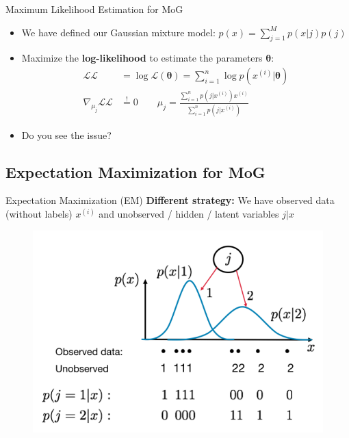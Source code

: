 \begin{frame}{Maximum Likelihood Estimation for MoG}{}
	\begin{itemize}
		\item We have defined our Gaussian mixture model: $p(x) = \sum_{j=1}^M p(x \vert j) p(j)$
		\item Maximize the \textbf{log-likelihood} to estimate the parameters $\bm{\theta}$:
		\begin{align}
			\mathcal{L}\mathcal{L}
				&= \log \mathcal{L}(\bm{\theta}) = \sum_{i=1}^n \log p(x^{(i)} \vert \bm{\theta}) \\[3mm]
			\nabla_{\mu_j} \mathcal{L}\mathcal{L} &\overset{!}{=} 0
			\qquad
			\mu_j = \frac{\sum_{i=1}^n p(j \vert x^{(i)}) x^{(i)}}{\sum_{i=1}^n p(j \vert x^{(i)})}
		\end{align}
		\item Do you see the issue? 
	\end{itemize}
\end{frame}


\subsection{Expectation Maximization for MoG}

\begin{frame}{Expectation Maximization (EM)}{}
	\textbf{Different strategy:} We have observed data (without labels) $x^{(i)}$ and unobserved / hidden / latent variables $j \vert x$

	\begin{figure}
		\centering
		\includegraphics[scale=0.3]{04_density_estimation/02_img/em_1}
	\end{figure}
\end{frame}


